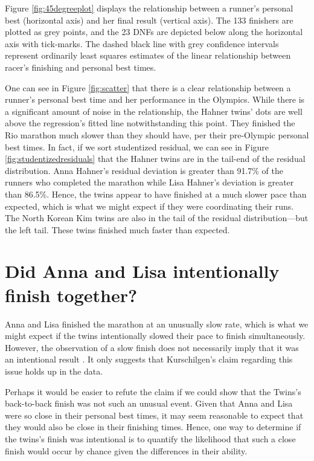 \documentclass[12pt,titlepage]{article}
\begin{document}
Figure \ref{fig:45degreeplot} displays the relationship between a
runner's personal best (horizontal axis) and her final result
(vertical axis).  The 133 finishers are plotted as grey points, and
the 23 DNFs are depicted below along the horizontal axis with
tick-marks.  The dashed black line with grey confidence intervals
represent ordinarily least squares estimates of the linear
relationship between racer's finishing and personal best times.

One can see in Figure \ref{fig:scatter} that there is a clear
relationship between a runner's personal best time and her performance
in the Olympics.  While there is a significant amount of noise in the
relationship, the Hahner twins' dots are well above the regression's
fitted line notwithstanding this point.  They finished the Rio
marathon much slower than they should have, per their pre-Olympic
personal best times.  In fact, if we sort studentized residual, we can
see in Figure \ref{fig:studentizedresiduals} that the Hahner twins are
in the tail-end of the residual distribution.  Anna Hahner's residual
deviation is greater than 91.7\% of the runners who completed the
marathon while Lisa Hahner's deviation is greater than 86.5\%.  Hence,
the twins appear to have finished at a much slower pace than expected,
which is what we might expect if they were coordinating their runs.
The North Korean Kim twins are also in the tail of the residual
distribution---but the left tail.  These twins finished much faster
than expected. 

\section*{Did Anna and Lisa intentionally finish together?}

Anna and Lisa finished the marathon at an unusually slow rate, which is what we might expect if the twins intentionally slowed their pace to finish simultaneously.  However, the observation of a slow finish does not necessarily imply that it was an intentional result .  It only suggests that Kurschilgen's claim regarding this issue holds up in the data.

Perhaps it would be easier to refute the claim if we could show that the Twins's back-to-back finish was not such an unusual event.  Given that Anna and Lisa were so close in their personal best times, it may seem reasonable to expect that they would also be close in their finishing times.   Hence, one way to determine if the twins's finish was intentional is to quantify the likelihood that such a close finish would occur by chance given the differences in their ability. 
\end{document}

